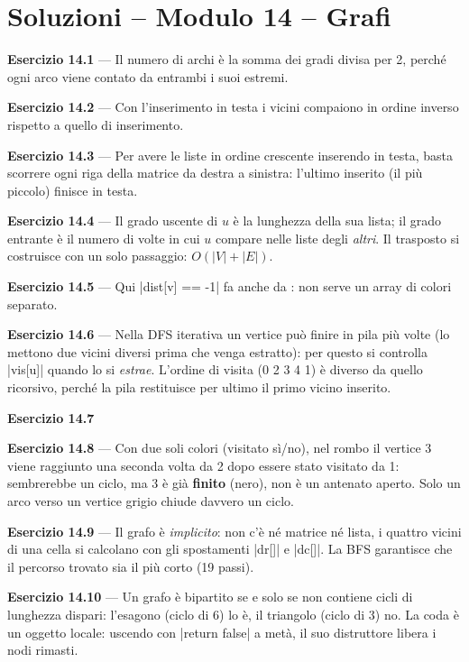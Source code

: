 \chapter{Soluzioni -- Modulo 14 -- Grafi}

\textbf{Esercizio 14.1} --- Il numero di archi è la somma dei gradi divisa per 2, perché
ogni arco viene contato da entrambi i suoi estremi.

\textbf{Esercizio 14.2} --- Con l'inserimento in testa i vicini compaiono in ordine
inverso rispetto a quello di inserimento.

\textbf{Esercizio 14.3} --- Per avere le liste in ordine crescente inserendo in testa,
basta scorrere ogni riga della matrice da destra a sinistra: l'ultimo inserito (il più
piccolo) finisce in testa.

\textbf{Esercizio 14.4} --- Il grado uscente di $u$ è la lunghezza della sua lista; il
grado entrante è il numero di volte in cui $u$ compare nelle liste degli \emph{altri}.
Il trasposto si costruisce con un solo passaggio: $O(|V| + |E|)$.

\textbf{Esercizio 14.5} --- Qui \cc|dist[v] == -1| fa anche da : non serve un
array di colori separato.

\textbf{Esercizio 14.6} --- Nella DFS iterativa un vertice può finire in pila più volte
(lo mettono due vicini diversi prima che venga estratto): per questo si controlla
\cc|vis[u]| quando lo si \emph{estrae}. L'ordine di visita (0 2 3 4 1) è diverso da quello
ricorsivo, perché la pila restituisce per ultimo il primo vicino inserito.

\textbf{Esercizio 14.7}

\textbf{Esercizio 14.8} --- Con due soli colori (visitato sì/no), nel rombo il vertice 3
viene raggiunto una seconda volta da 2 dopo essere stato visitato da 1: sembrerebbe un
ciclo, ma 3 è già \textbf{finito} (nero), non è un antenato aperto. Solo un arco verso un
vertice grigio chiude davvero un ciclo.

\textbf{Esercizio 14.9} --- Il grafo è \emph{implicito}: non c'è né matrice né lista, i
quattro vicini di una cella si calcolano con gli spostamenti \cc|dr[]| e \cc|dc[]|. La
BFS garantisce che il percorso trovato sia il più corto (19 passi).

\textbf{Esercizio 14.10} --- Un grafo è bipartito se e solo se non contiene cicli di
lunghezza dispari: l'esagono (ciclo di 6) lo è, il triangolo (ciclo di 3) no. La coda è
un oggetto locale: uscendo con \cc|return false| a metà, il suo distruttore libera i nodi
rimasti.
